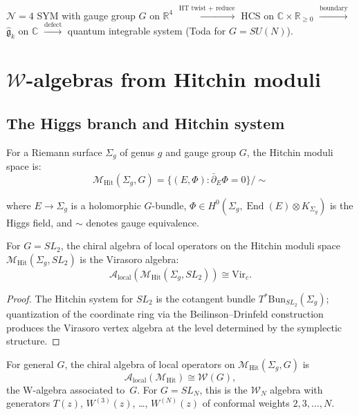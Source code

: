 \begin{example}[Explicit tower for \texorpdfstring{$\mathcal{N}=4$}{N=4} SYM]
$\mathcal{N}=4$ SYM with gauge group $G$ on $\mathbb{R}^4$
$\xrightarrow{\text{HT twist + reduce}}$
HCS on $\mathbb{C} \times \mathbb{R}_{\geq 0}$
$\xrightarrow{\text{boundary}}$
$\widehat{\mathfrak{g}}_k$ on $\mathbb{C}$
$\xrightarrow{\text{defect}}$
quantum integrable system (Toda for $G = SU(N)$).
\end{example}

\section{$\mathcal{W}$-algebras from Hitchin moduli}

\subsection{The Higgs branch and Hitchin system}

\begin{definition}
For a Riemann surface $\Sigma_g$ of genus $g$ and gauge group $G$, the Hitchin 
moduli space is:
\[\mathcal{M}_{\text{Hit}}(\Sigma_g, G) = \{(E, \Phi) : \bar{\partial}_E \Phi = 0\} / 
\sim\]

where $E \to \Sigma_g$ is a holomorphic $G$-bundle, $\Phi \in H^0(\Sigma_g, \operatorname{End}(E) \otimes K_{\Sigma_g})$ is the Higgs field, and $\sim$ denotes gauge equivalence.
\end{definition}

\begin{proposition}\label{prop:virasoro-from-hitchin}
For $G = SL_2$, the chiral algebra of local operators on the Hitchin moduli space $\mathcal{M}_{\mathrm{Hit}}(\Sigma_g, SL_2)$ is the Virasoro algebra:
\[\mathcal{A}_{\mathrm{local}}(\mathcal{M}_{\mathrm{Hit}}(\Sigma_g, SL_2)) \cong \mathrm{Vir}_c.\]
\end{proposition}

\begin{proof}
The Hitchin system for $SL_2$ is the cotangent bundle $T^*\mathrm{Bun}_{SL_2}(\Sigma_g)$; quantization of the coordinate ring via the Beilinson--Drinfeld construction \cite{BD04} produces the Virasoro vertex algebra at the level determined by the symplectic structure.
\end{proof}

\begin{conjecture}
\label{conj:w-algebra-hitchin}
For general $G$, the chiral algebra of local operators on $\mathcal{M}_{\mathrm{Hit}}(\Sigma_g, G)$ is
\[
\mathcal{A}_{\mathrm{local}}(\mathcal{M}_{\mathrm{Hit}}) \cong \mathcal{W}(G),
\]
the W-algebra associated to~$G$.  For $G = SL_N$, this is the
$\mathcal{W}_N$ algebra with generators
$T(z)$, $W^{(3)}(z)$, \ldots, $W^{(N)}(z)$
of conformal weights $2, 3, \ldots, N$.
\end{conjecture}


